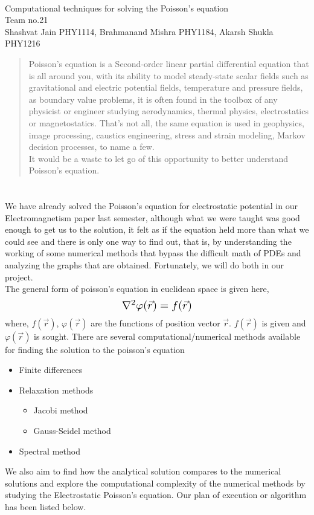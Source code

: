 \documentclass[letterpaper,11pt]{article}
\newcommand{\newsection}[1]{\section{\sffamily{\bfseries{#1}}}}
\begin{document}
	\begin{center}
		 \\[4mm]
		\large{ Computational techniques for solving the Poisson’s equation} \\[4mm]
		\large{\textcolor{greyish}{Team no.21}} \\[1mm]
		\large{\textcolor{greyish}{Shashvat Jain PHY1114, Brahmanand Mishra PHY1184, Akarsh Shukla PHY1216}}\\[3mm]
		\begin{abstract}
			\noindent
			Poisson's equation is a Second-order linear partial differential equation that is all around you, with its ability to model steady-state scalar fields such as gravitational and electric potential fields, temperature and pressure fields, as boundary value problems, it is often found in the toolbox of any physicist or engineer studying aerodynamics, thermal physics, electrostatics or magnetostatics. That’s not all, the same equation is used in geophysics, image processing, caustics engineering, stress and strain modeling, Markov decision processes, to name a few.
\\ \noindent
			It would be a waste to let go of this opportunity to better understand Poisson's equation.  
		\end{abstract}	
	\end{center}
	
	\newsection{PROJECT SYNOPSIS}
	\noindent
	We have already solved the Poisson’s equation for electrostatic potential in our Electromagnetism paper last semester, although what we were taught was good enough to get us to the solution, it felt as if the equation held more than what we could see and there is only one way to find out, that is, by understanding the working of some numerical methods that bypass the difficult math of PDEs and analyzing the graphs that are obtained. Fortunately, we will do both in our project.\\
	The general form of poisson's equation in euclidean space is given here,
	\[
		\scalebox{1.3}{$\nabla^2 \varphi(\vec{r}) = f(\vec{r})$}
	\]
	where, $f(\vec{r})$, $\varphi(\vec{r})$ are the functions of position vector $\vec{r}$. $f(\vec{r})$ is given and $\varphi(\vec{r})$ is sought. 
	\noindent
	There are several computational/numerical methods available for finding the solution to the poisson's equation 
	\begin{itemize}
		\setlength\itemsep{0.01mm}
		\item Finite differences
		\item  Relaxation methods
		\begin{itemize}
			\item Jacobi method
			\item Gauss-Seidel method
		\end{itemize}
		\item Spectral method 
	\end{itemize}
	\noindent
	We also aim to find how the analytical solution compares to the numerical solutions and explore the computational complexity of the numerical methods by studying the Electrostatic Poisson’s equation. Our plan of execution or algorithm has been listed below. 
	
\end{document}
